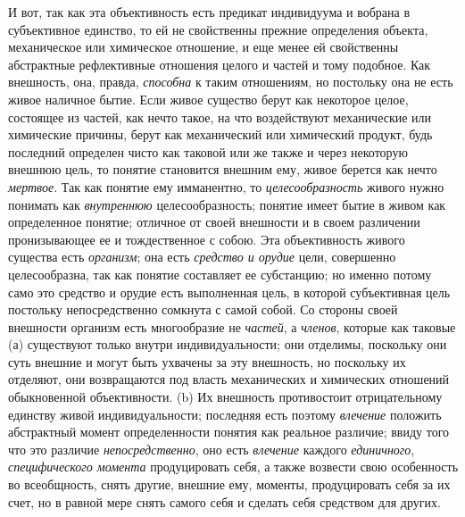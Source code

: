 И вот, так как эта объективность есть предикат индивидуума и
вобрана в субъективное единство, то ей не свойственны прежние определения
объекта, механическое или химическое отношение, и еще менее ей свойственны
абстрактные рефлективные отношения целого и частей и тому подобное. Как
внешность, она, правда, {\em способна}
к таким отношениям, но постольку она не есть живое наличное
бытие. Если живое существо берут как некоторое целое, состоящее из частей,
как нечто такое, на что воздействуют механические или химические причины,
берут как механический или химический продукт, будь последний определен
чисто как таковой или же также и через некоторую внешнюю
цель, то понятие становится внешним ему, живое берется как нечто
{\em мертвое}. Так как
понятие ему имманентно, то
{\em целесообразность}
живого нужно понимать как
{\em внутреннюю}
целесообразность; понятие имеет бытие в живом как
определенное понятие; отличное от своей внешности и в своем различении
пронизывающее ее и тождественное с собою. Эта объективность живого существа
есть {\em организм}; она
есть {\em средство и орудие}
цели, совершенно целесообразна, так как понятие составляет ее
субстанцию; но именно потому само это средство и орудие есть выполненная
цель, в которой субъективная цель постольку непосредственно сомкнута с
самой собой. Со стороны своей внешности организм есть многообразие не
{\em частей}, а
{\em членов}, которые как
таковые (а) существуют только внутри индивидуальности; они отделимы,
поскольку они суть внешние и могут быть ухвачены за эту внешность, но
поскольку их отделяют, они возвращаются под власть механических и
химических отношений обыкновенной объективности. (b) Их внешность
противостоит отрицательному единству живой индивидуальности; последняя есть
поэтому {\em влечение}
положить абстрактный момент определенности понятия как
реальное различие; ввиду того что это различие
{\em непосредственно},
оно есть {\em влечение}
каждого {\em единичного},
{\em специфического момента}
продуцировать себя, а также возвести свою особенность во
всеобщность, снять другие, внешние ему, моменты, продуцировать себя за их
счет, но в равной мере снять самого себя и сделать себя средством для
других.

